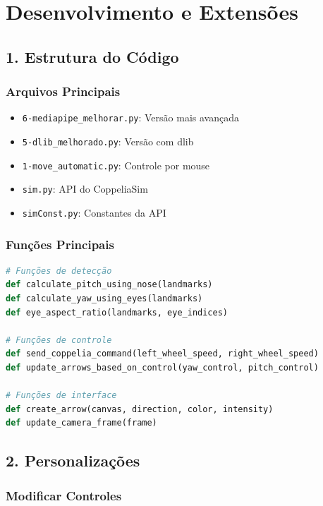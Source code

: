 \documentclass[12pt,a4paper]{article}
\begin{document}
\section{Desenvolvimento e Extensões}

\subsection{1. Estrutura do Código}

\subsubsection{Arquivos Principais}

\begin{itemize}
    \item \texttt{6-mediapipe\_melhorar.py}: Versão mais avançada
    \item \texttt{5-dlib\_melhorado.py}: Versão com dlib
    \item \texttt{1-move\_automatic.py}: Controle por mouse
    \item \texttt{sim.py}: API do CoppeliaSim
    \item \texttt{simConst.py}: Constantes da API
\end{itemize}

\subsubsection{Funções Principais}

\begin{lstlisting}[language=python]
# Funções de detecção
def calculate_pitch_using_nose(landmarks)
def calculate_yaw_using_eyes(landmarks)
def eye_aspect_ratio(landmarks, eye_indices)

# Funções de controle
def send_coppelia_command(left_wheel_speed, right_wheel_speed)
def update_arrows_based_on_control(yaw_control, pitch_control)

# Funções de interface
def create_arrow(canvas, direction, color, intensity)
def update_camera_frame(frame)
\end{lstlisting}

\subsection{2. Personalizações}

\subsubsection{Modificar Controles}
\end{document}
